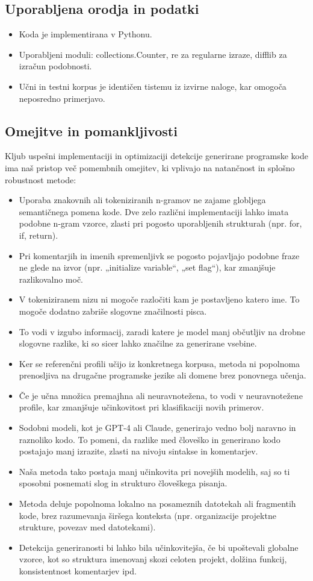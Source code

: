 \documentclass[sigconf,nonacm]{acmart}
\begin{document}
\subsection{Uporabljena orodja in podatki}
\begin{itemize}
	\item Koda je implementirana v Pythonu.
	\item Uporabljeni moduli: collections.Counter, re za regularne izraze, difflib za izračun podobnosti.
	\item Učni in testni korpus je identičen tistemu iz izvirne naloge, kar omogoča neposredno primerjavo.
\end{itemize}

\subsection{Omejitve in pomankljivosti}
Kljub uspešni implementaciji in optimizaciji detekcije generirane programske kode ima naš pristop več pomembnih omejitev, ki vplivajo na natančnost in splošno robustnost metode:
\begin{itemize}
	\item Uporaba znakovnih ali tokeniziranih n-gramov ne zajame globljega semantičnega pomena kode. Dve zelo različni implementaciji lahko imata podobne n-gram vzorce, zlasti pri pogosto uporabljenih strukturah (npr. for, if, return).
	\item Pri komentarjih in imenih spremenljivk se pogosto pojavljajo podobne fraze ne glede na izvor (npr. „initialize variable“, „set flag“), kar zmanjšuje razlikovalno moč.
	\item V tokeniziranem nizu ni mogoče razločiti kam je postavljeno katero ime. To mogoče dodatno zabriše slogovne značilnosti pisca.
	\item To vodi v izgubo informacij, zaradi katere je model manj občutljiv na drobne slogovne razlike, ki so sicer lahko značilne za generirane vsebine.
	\item Ker se referenčni profili učijo iz konkretnega korpusa, metoda ni popolnoma prenosljiva na drugačne programske jezike ali domene brez ponovnega učenja.
	\item Če je učna množica premajhna ali neuravnotežena, to vodi v neuravnotežene profile, kar zmanjšuje učinkovitost pri klasifikaciji novih primerov.
	\item Sodobni modeli, kot je GPT-4 ali Claude, generirajo vedno bolj naravno in raznoliko kodo. To pomeni, da razlike med človeško in generirano kodo postajajo manj izrazite, zlasti na nivoju sintakse in komentarjev.
	\item Naša metoda tako postaja manj učinkovita pri novejših modelih, saj so ti sposobni posnemati slog in strukturo človeškega pisanja.
	\item Metoda deluje popolnoma lokalno na posameznih datotekah ali fragmentih kode, brez razumevanja širšega konteksta (npr. organizacije projektne strukture, povezav med datotekami).
	\item Detekcija generiranosti bi lahko bila učinkovitejša, če bi upoštevali globalne vzorce, kot so struktura imenovanj skozi celoten projekt, dolžina funkcij, konsistentnost komentarjev ipd.
\end{itemize}
\end{document}
